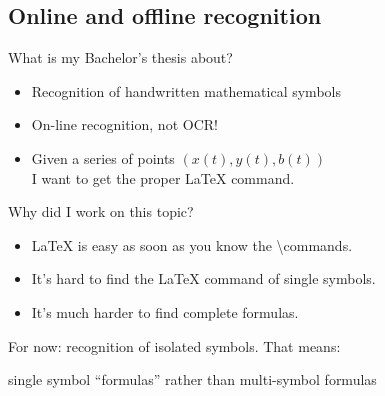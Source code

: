 \subsection{Online and offline recognition}

\begin{frame}{What is my Bachelor's thesis about?}
    \begin{itemize}
        \item Recognition of handwritten mathematical symbols
        \item On-line recognition, not OCR!
        \item Given a series of points $(x(t), y(t), b(t))$\\
              I want to get the proper \LaTeX{} command.
    \end{itemize}
\end{frame}

\begin{frame}{Why did I work on this topic?}
    \begin{itemize}
        \item \LaTeX{} is easy as soon as you know the \textbackslash{}commands.
        \item It's hard to find the \LaTeX{} command of single symbols.
        \item It's much harder to find complete formulas.
    \end{itemize}


    For now: recognition of isolated symbols. That means:

    single symbol \enquote{formulas} rather than multi-symbol formulas
\end{frame}